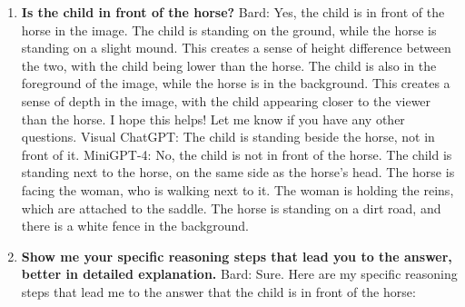 \begin{enumerate}
        The child is standing on the ground, while the horse is standing on a slight mound. This creates a sense of height difference between the two, with the child being lower than the horse.
        The child is wearing a blue shirt and jeans, while the horse is a brown horse with a white mane and tail. This creates a contrast in color between the two, with the child being lighter in color than the horse.
        The child is in the foreground of the image, while the horse is in the background. This creates a sense of depth in the image, with the child appearing closer to the viewer than the horse.
        I hope this helps! Let me know if you have any other questions.
        \subitem Visual ChatGPT: The woman is walking the horse, with the child standing beside them.
        \subitem MiniGPT-4: The image shows a woman walking next to a horse. The woman is wearing a black helmet and black pants, and the horse is wearing a brown saddle and black bridle. The woman is holding the reins of the horse, which are attached to the saddle. The horse is standing on a dirt road, and there is a white fence in the background.
        \item \textbf{Is the child in front of the horse?}
        \subitem Bard: Yes, the child is in front of the horse in the image. The child is standing on the ground, while the horse is standing on a slight mound. This creates a sense of height difference between the two, with the child being lower than the horse. The child is also in the foreground of the image, while the horse is in the background. This creates a sense of depth in the image, with the child appearing closer to the viewer than the horse.
        I hope this helps! Let me know if you have any other questions.
        \subitem Visual ChatGPT: The child is standing beside the horse, not in front of it.
        \subitem MiniGPT-4: No, the child is not in front of the horse. The child is standing next to the horse, on the same side as the horse’s head. The horse is facing the woman, who is walking next to it. The woman is holding the reins, which are attached to the saddle. The horse is standing on a dirt road, and there is a white fence in the background.
        \item \textbf{Show me your specific reasoning steps that lead you to the answer, better in detailed explanation.}
        \subitem Bard: Sure. Here are my specific reasoning steps that lead me to the answer that the child is in front of the horse:


\end{enumerate}
